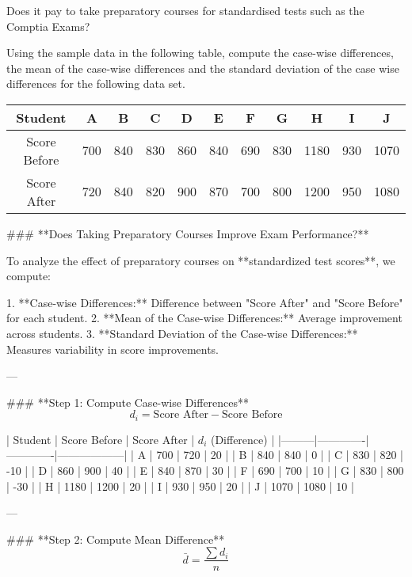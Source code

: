 
\item Does it pay to take preparatory courses for standardised tests such as the Comptia Exams? 

Using the sample data in the following table, compute the case-wise differences, the mean of the case-wise differences and the standard deviation of the case wise differences for the following data set.

\begin{center}
	\begin{tabular}{|c|c|c|c|c|c|c|c|c|c|c|}
		\hline  
		Student	&	A	&	B	&	C	&	D	&	E	&	F	&	G	&	H	&	I	&	J	\\ \hline
		Score Before	&	700	&	840	&	830	&	860	&	840	&	690	&	830	&	1180	&	930	&	1070	\\ \hline
		Score After	&	720	&	840	&	820	&	900	&	870	&	700	&	800	&	1200	&	950	&	1080	\\ \hline
	\end{tabular} 
\end{center}

### **Does Taking Preparatory Courses Improve Exam Performance?**

To analyze the effect of preparatory courses on **standardized test scores**, we compute:

1. **Case-wise Differences:** Difference between "Score After" and "Score Before" for each student.
2. **Mean of the Case-wise Differences:** Average improvement across students.
3. **Standard Deviation of the Case-wise Differences:** Measures variability in score improvements.

---

### **Step 1: Compute Case-wise Differences**
\[
d_i = \text{Score After} - \text{Score Before}
\]

| Student | Score Before | Score After | \( d_i \) (Difference) |
|---------|-------------|-------------|------------------|
| A       | 700        | 720        | 20              |
| B       | 840        | 840        | 0               |
| C       | 830        | 820        | -10             |
| D       | 860        | 900        | 40              |
| E       | 840        | 870        | 30              |
| F       | 690        | 700        | 10              |
| G       | 830        | 800        | -30             |
| H       | 1180       | 1200       | 20              |
| I       | 930        | 950        | 20              |
| J       | 1070       | 1080       | 10              |

---

### **Step 2: Compute Mean Difference**
\[
\bar{d} = \frac{\sum d_i}{n}
\]

